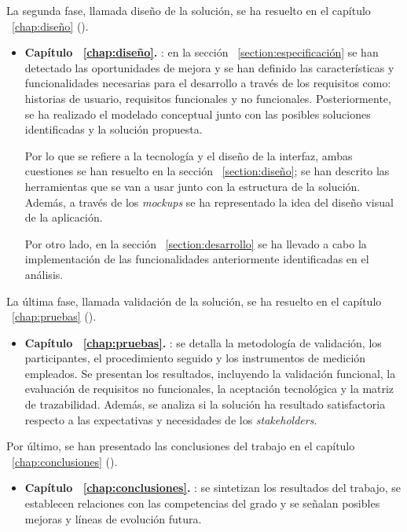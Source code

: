La segunda fase, llamada diseño de la solución, se ha resuelto en el capítulo ~\ref{chap:diseño} ().

\begin{itemize}
    \item \textbf{Capítulo ~\ref{chap:diseño}. }: en la sección ~\ref{section:especificación} se han detectado las oportunidades de mejora y se han definido las características y funcionalidades necesarias para el desarrollo a través de los requisitos como: historias de usuario, requisitos funcionales y no funcionales. Posteriormente, se ha realizado el modelado conceptual junto con las posibles soluciones identificadas y la solución propuesta.
    
    Por lo que se refiere a la tecnología y el diseño de la interfaz, ambas cuestiones se han resuelto en la sección ~\ref{section:diseño}; se han descrito las herramientas que se van a usar junto con la estructura de la solución. Además, a través de los \textit{mockups} se ha representado la idea del diseño visual de la aplicación.

    Por otro lado, en la sección ~\ref{section:desarrollo} se ha llevado a cabo la implementación de las funcionalidades anteriormente identificadas en el análisis.
    
\end{itemize}

La última fase, llamada validación de la solución, se ha resuelto en el capítulo ~\ref{chap:pruebas} ().

\begin{itemize}
    \item \textbf{Capítulo ~\ref{chap:pruebas}. }: se detalla la metodología de validación, los participantes, el procedimiento seguido y los instrumentos de medición empleados. Se presentan los resultados, incluyendo la validación funcional, la evaluación de requisitos no funcionales, la aceptación tecnológica y la matriz de trazabilidad. Además, se analiza si la solución ha resultado satisfactoria respecto a las expectativas y necesidades de los \textit{stakeholders}.
\end{itemize}

Por último, se han presentado las conclusiones del trabajo en el capítulo ~\ref{chap:conclusiones} 
().

\begin{itemize}
    \item \textbf{Capítulo ~\ref{chap:conclusiones}. }: se sintetizan los resultados del trabajo, se establecen relaciones con las competencias del grado y se señalan posibles mejoras y líneas de evolución futura.
\end{itemize}